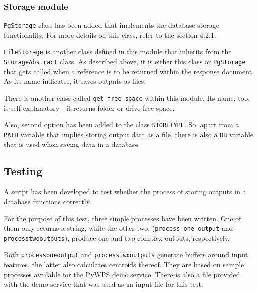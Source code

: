 \subsubsection{Storage module}

\texttt{PgStorage} class has been added that implements the
database storage functionality. For more details on this class,
refer to the section 4.2.1. 

\texttt{FileStorage} is another class defined in this module that inherits 
from \linebreak the \texttt{StorageAbstract} class. As described above, 
it is either this class or  \texttt{PgStorage} that gets called 
when a reference is to be returned within the response document. 
As its name indicates, it saves outputs as files.

There is another class called \texttt{get\_free\_space} within
this module. Its name, too, is self-explanatory - it returns
folder or drive free space.

Also, second option has been added to the class
\texttt{STORE\textunderscore TYPE}.  So, apart from a \texttt{PATH}
variable that implies storing output data as a file, there is also a
\texttt{DB} variable that is used when saving data in a database.

\subsection{Testing} 

A script has been developed to test whether the process of storing
outputs in a database functions correctly.

For the purpose of this test, three simple processes have been
written. One of them only returns a string, while the other two,
(\texttt{process\_one\_output} and \linebreak
\texttt{process\textunderscore two\textunderscore outputs}), produce
one and two complex outputs, respectively.

Both \texttt{process\textunderscore one\textunderscore output} and
\texttt{process\textunderscore two\textunderscore outputs} generate
buffers around input features, the latter also calculates centroids
thereof. They are based on sample processes available for the PyWPS
demo service. There is also a  file provided with the demo
service that was used as an input file for this test.

